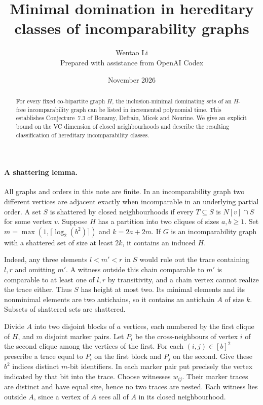 \documentclass[11pt]{article}
\title{Minimal domination in hereditary classes of incomparability graphs}
\author{Wentao Li\\[2pt]\small Prepared with assistance from OpenAI Codex}
\date{November 2026}
\begin{document}
\maketitle
\begin{abstract}
For every fixed co-bipartite graph $H$, the inclusion-minimal dominating sets of an $H$-free incomparability graph can be listed in incremental polynomial time. This establishes Conjecture~7.3 of Bonamy, Defrain, Micek and Nourine. We give an explicit bound on the VC dimension of closed neighbourhoods and describe the resulting classification of hereditary incomparability classes.
\end{abstract}

\paragraph{A shattering lemma.} All graphs and orders in this note are finite. In an incomparability graph two different vertices are adjacent exactly when incomparable in an underlying partial order. A set $S$ is shattered by closed neighbourhoods if every $T\subseteq S$ is $N[v]\cap S$ for some vertex $v$. Suppose $H$ has a partition into two cliques of sizes $a,b\ge1$. Set $m=\max(1,\lceil\log_2(b^2)\rceil)$ and $k=2a+2m$. If $G$ is an incomparability graph with a shattered set of size at least $2k$, it contains an induced $H$.

Indeed, any three elements $l<m'<r$ in $S$ would rule out the trace containing $l,r$ and omitting $m'$. A witness outside this chain comparable to $m'$ is comparable to at least one of $l,r$ by transitivity, and a chain vertex cannot realize the trace either. Thus $S$ has height at most two. Its minimal elements and its nonminimal elements are two antichains, so it contains an antichain $A$ of size $k$. Subsets of shattered sets are shattered.

Divide $A$ into two disjoint blocks of $a$ vertices, each numbered by the first clique of $H$, and $m$ disjoint marker pairs. Let $P_i$ be the cross-neighbours of vertex $i$ of the second clique among the vertices of the first. For each $(i,j)\in[b]^2$ prescribe a trace equal to $P_i$ on the first block and $P_j$ on the second. Give these $b^2$ indices distinct $m$-bit identifiers. In each marker pair put precisely the vertex indicated by that bit into the trace. Choose witnesses $w_{ij}$. Their marker traces are distinct and have equal size, hence no two traces are nested. Each witness lies outside $A$, since a vertex of $A$ sees all of $A$ in its closed neighbourhood.
\end{document}
